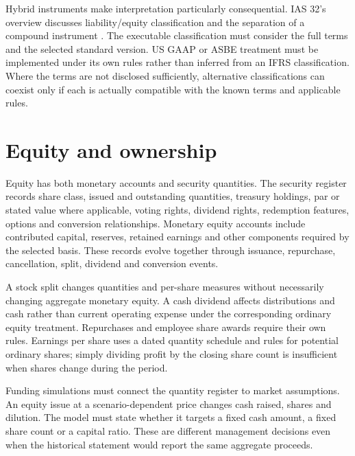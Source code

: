 Hybrid instruments make interpretation particularly consequential. IAS 32's
overview discusses liability/equity classification and the separation of a
compound instrument \citep{ias32}. The executable classification must consider
the full terms and the selected standard version. US GAAP or ASBE treatment
must be implemented under its own rules rather than inferred from an IFRS
classification. Where the terms are not disclosed sufficiently, alternative
classifications can coexist only if each is actually compatible with the
known terms and applicable rules.



\section{Equity and ownership}

Equity has both monetary accounts and security quantities. The security
register records share class, issued and outstanding quantities, treasury
holdings, par or stated value where applicable, voting rights, dividend rights,
redemption features, options and conversion relationships. Monetary equity
accounts include contributed capital, reserves, retained earnings and other
components required by the selected basis. These records evolve together
through issuance, repurchase, cancellation, split, dividend and conversion
events.

A stock split changes quantities and per-share measures without necessarily
changing aggregate monetary equity. A cash dividend affects distributions and
cash rather than current operating expense under the corresponding ordinary
equity treatment. Repurchases and employee share awards require their own
rules. Earnings per share uses a dated quantity schedule and rules for potential
ordinary shares; simply dividing profit by the closing share count is
insufficient when shares change during the period.

Funding simulations must connect the quantity register to market assumptions.
An equity issue at a scenario-dependent price changes cash raised, shares and
dilution. The model must state whether it targets a fixed cash amount, a fixed
share count or a capital ratio. These are different management decisions even
when the historical statement would report the same aggregate proceeds.







